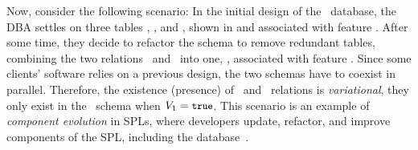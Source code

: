 %
%

Now, consider the following scenario:
In the initial design of the \basic\ database, the DBA
settles on three tables \engemp, \othemp, and \job, shown in  and associated
with feature \vOne. 
After some time, they decide
to refactor the schema to remove redundant tables,
combining the two
relations \engemp\ and \othemp\ into one, \empacct, associated with feature \vTwo. 
Since some clients' 
software relies on a previous design, the two schemas have to coexist in parallel.
Therefore, the existence (presence) of \engemp\ and \othemp\
relations is \emph{variational}, they only exist in the \basic\
schema when $\vOne=\t$.
This scenario is an example of \emph{component evolution} in SPLs, where
developers
update, refactor, and improve components of the SPL, including the database~\cite{dbSPLevolve}.

